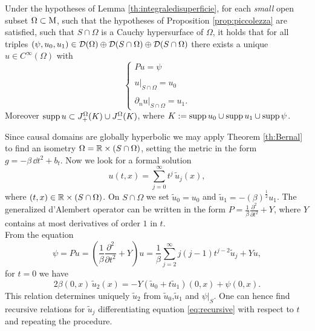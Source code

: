 \begin{theorem}
	Under the hypotheses of Lemma \ref{th:integraledisuperficie}, for each \emph{small} open subset $\Omega\subset\mathrm{M}$, such that the hypotheses of Proposition \ref{prop:piccolezza} are satisfied, such that $S\cap\Omega$ is a Cauchy hypersurface of $\Omega$, it holds that for all triples $(\psi,u_0,u_1)\in\mathcal{D}(\Omega)\oplus\mathcal{D}(S\cap\Omega)\oplus\mathcal{D}(S\cap\Omega)$ there exists a unique $u\in C^\infty(\Omega)$ with
	\begin{equation}
	\begin{cases}
	P u=\psi\\
	\\
	u|_{S\cap\Omega}=u_0\\
	\\
	\partial_n u|_{S\cap\Omega}=u_1.
	\end{cases}
	\end{equation}
	Moreover $\text{supp}\,u\subset J_+^\Omega(K)\cup J_-^\Omega(K)$, where $K:=\text{supp}\, u_0\cup\text{supp}\,u_1\cup\text{supp}\,\psi$.
	
	\label{th:localsolvability}
\end{theorem}
\Proofsketch Since causal domains are globally hyperbolic we may apply Theorem \ref{th:Bernal} to find an isometry $\Omega = {\mathbb R} \times (S \cap \Omega)$, setting the metric in the form $g=-\beta\,\dd t^2+b_t$. Now we look for a formal solution
\begin{equation}
	u(t,x)=\sum_{j=0}^{\infty}t^j\,\widetilde{u}_j(x),
	\label{eq:seriesrec}
\end{equation}			
where $(t,x)\in{\mathbb R} \times (S \cap \Omega)$. On $S\cap\Omega$ we set $\widetilde{u}_0=u_0$ and $\widetilde{u}_1=-(\beta)^\frac12 u_1$. The generalized d'Alembert operator can be written in the form $P=\frac1{\beta}\frac{\partial^2}{\partial t^2}+Y$, where $Y$ contains at most derivatives of order $1$ in $t$.\\
From the equation
\begin{equation}
	\psi=Pu=\left(\frac1{\beta}\frac{\partial^2}{\partial t^2}+Y\right)u=\frac1{\beta}\sum_{j=2}^{\infty}j(j-1)t^{j-2}\widetilde{u}_j	+Yu,
	\label{eq:recursive}
\end{equation}		
for $t=0$ we have
\[	2\beta(0,x)\,\widetilde{u}_2(x)=-Y(\widetilde{u}_0+t\widetilde{u}_1)(0,x)+\psi(0,x).		\]
This relation determines uniquely $\widetilde{u}_2$ from $\widetilde{u}_0$,$\widetilde{u}_1$ and $\psi|_S$. One can hence find recursive relations for $\widetilde{u}_j$ differentiating equation \eqref{eq:recursive} with respect to $t$ and repeating the procedure.\\
